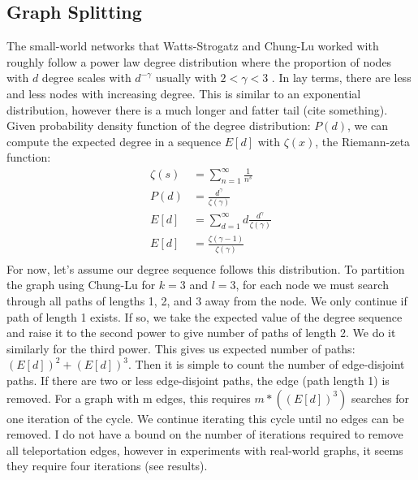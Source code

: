 \documentclass{article}
\begin{document}
\subsection{Graph Splitting}
The small-world networks that Watts-Strogatz and Chung-Lu worked with roughly follow a power law degree distribution where the proportion of nodes with $d$ degree scales with $d^{-\gamma}$ usually with $2 < \gamma < 3$ \cite{Chung:2004,Watts:1998}. In lay terms, there are less and less nodes with increasing degree. This is similar to an exponential distribution, however there is a much longer and fatter tail (cite something). Given probability density function of the degree distribution: $P(d)$, we can compute the expected degree in a sequence $E[d]$ with $\zeta(x)$, the Riemann-zeta function:\\
\begin{align*}
\zeta(s) & = \sum_{n=1}^{\infty} \frac{1}{n^s}\\
P(d) & = \frac{d^{\gamma}}{\zeta(\gamma)}\\
E[d] & = \sum_{d=1}^{\infty} d \frac{d^{\gamma}}{\zeta(\gamma)} \\
E[d] & = \frac{\zeta(\gamma-1)}{\zeta(\gamma)}\\ 
\end{align*}
For now, let's assume our degree sequence follows this distribution. To partition the graph using Chung-Lu for $k = 3$ and $l = 3$, for each node we must search through all paths of lengths 1, 2, and 3 away from the node. We only continue if path of length 1 exists. If so, we take the expected value of the degree sequence and raise it to the second power to give number of paths of length 2. We do it similarly for the third power. This gives us expected number of paths: $(E[d])^{2}+(E[d])^{3}$. Then it is simple to count the number of edge-disjoint paths. If there are two or less edge-disjoint paths, the edge (path length 1) is removed. For a graph with m edges, this requires $m*((E[d])^{3})$ searches for one iteration of the cycle. We continue iterating this cycle until no edges can be removed. I do not have a bound on the number of iterations required to remove all teleportation edges, however in experiments with real-world graphs, it seems they require four iterations (see results).
\end{document}
